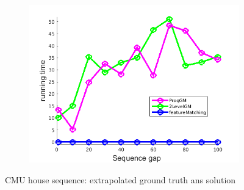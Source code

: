 \begin{figure}[h]
\begin{subfigure}[b]{0.3\textwidth}
		\includegraphics[scale=0.25]{"chapter3/fig/HouseSeq/anchor_descr/using_cpd_afftrafo/ext_solution/performance/time"}  
	\end{subfigure} 	
	\caption{CMU house sequence: extrapolated ground truth ans solution}
\end{figure}
\vspace{-20pt}
